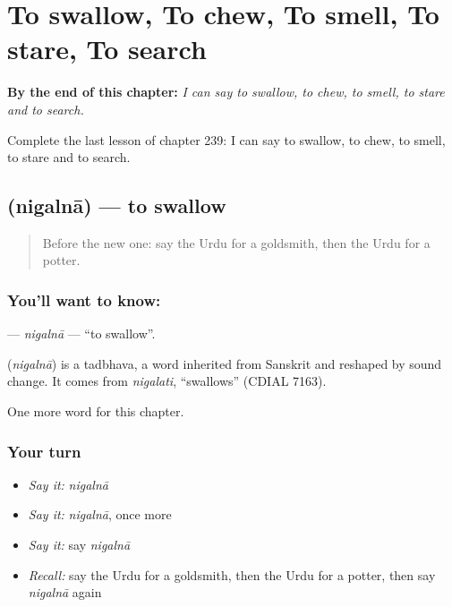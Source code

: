 
\chapter{To swallow, To chew, To smell, To stare, To search}
\label{ch:ur-to-swallow-to-chew-to-smell-to-stare-to-search}

\begin{chapteropening}
\textbf{By the end of this chapter:} \emph{I can say to swallow, to chew, to smell, to stare and to search.}

Complete the last lesson of chapter 239: I can say to swallow, to chew, to smell, to stare and to search.
\end{chapteropening}

\section[\texorpdfstring{\ur{نگلنا} (nigalnā)}{نگلنا (nigalnā)}]{ (nigalnā) — to swallow}

\label{lesson:UR-C239-nigalna}



\begin{quote}
Before the new one: say the Urdu for a goldsmith, then the Urdu for a potter.
\end{quote}

\subsection*{You'll want to know: }
\textbf{} — \emph{nigalnā} — \textquotedblleft{}to swallow\textquotedblright{}.

\begin{cousinweb}
\textbf{} (\emph{nigalnā}) is a tadbhava, a word inherited from Sanskrit and reshaped by sound change. It comes from \emph{nigalati}, \textquotedblleft{}swallows\textquotedblright{} (CDIAL 7163).
\end{cousinweb}

\begin{grammarlens}[title={What you've built}]
One more word for this chapter.
\end{grammarlens}

\subsection*{Your turn}
\begin{itemize}
\raggedright
  \item \emph{Say it:} \emph{nigalnā}
  \item \emph{Say it:} \emph{nigalnā}, once more
  \item \emph{Say it:} say \emph{nigalnā}
  \item \emph{Recall:} say the Urdu for a goldsmith, then the Urdu for a potter, then say \emph{nigalnā} again
\end{itemize}

